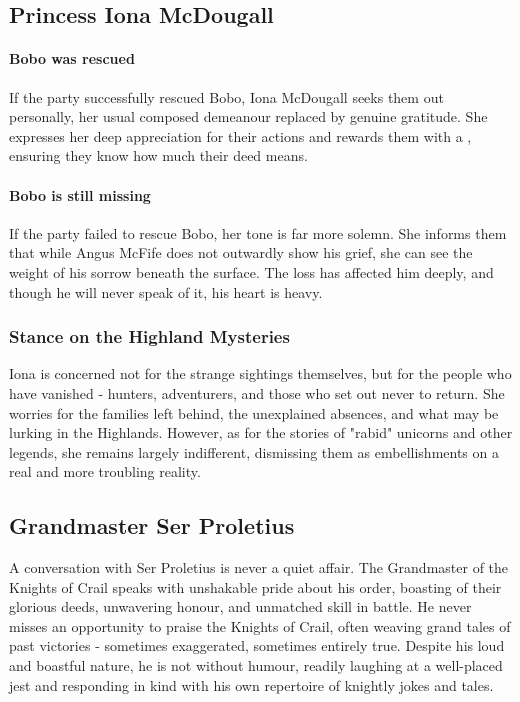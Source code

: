 \subsection*{Princess Iona McDougall}
{\entryfont \paragraph*{Bobo was rescued} If the party successfully rescued Bobo, Iona McDougall seeks them out personally, her usual composed demeanour replaced by genuine gratitude. She expresses her deep appreciation for their actions and rewards them with a \hyperref[magicalitem:HeartPureOfSteel]{}, ensuring they know how much their deed means.}
{\entryfont \paragraph*{Bobo is still missing}
If the party failed to rescue Bobo, her tone is far more solemn. She informs them that while Angus McFife does not outwardly show his grief, she can see the weight of his sorrow beneath the surface. The loss has affected him deeply, and though he will never speak of it, his heart is heavy.}
\subsubsection*{Stance on the Highland Mysteries}
{\entryfont Iona is concerned not for the strange sightings themselves, but for the people who have vanished - hunters, adventurers, and those who set out never to return. She worries for the families left behind, the unexplained absences, and what may be lurking in the Highlands. However, as for the stories of "rabid" unicorns and other legends, she remains largely indifferent, dismissing them as embellishments on a real and more troubling reality.}
\subsection*{Grandmaster Ser Proletius}
{\entryfont A conversation with Ser Proletius is never a quiet affair. The Grandmaster of the Knights of Crail speaks with unshakable pride about his order, boasting of their glorious deeds, unwavering honour, and unmatched skill in battle. He never misses an opportunity to praise the Knights of Crail, often weaving grand tales of past victories - sometimes exaggerated, sometimes entirely true. Despite his loud and boastful nature, he is not without humour, readily laughing at a well-placed jest and responding in kind with his own repertoire of knightly jokes and tales.}

